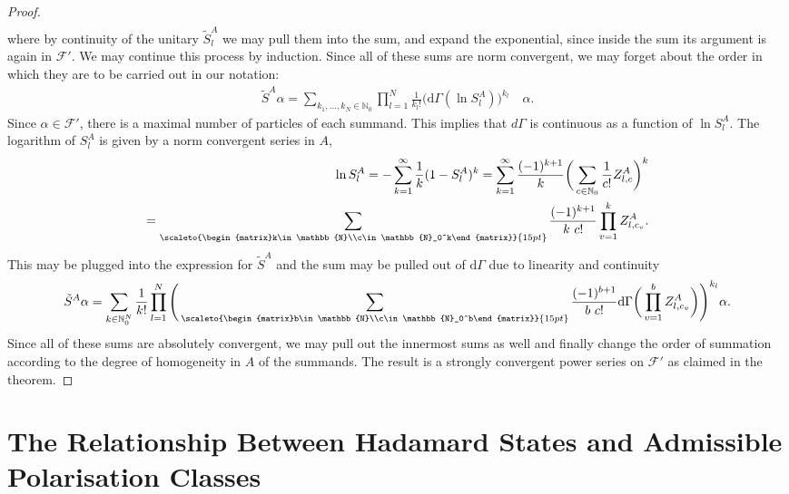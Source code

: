 \documentclass[b5paper,draft,openbib,12pt]{memoir}
\begin{document}
\begin{proof}
\begin{align}
\end{align}
where by continuity of the unitary \(\tilde{S}_{l}^A\) we may pull them into the sum,
and expand the exponential, since inside the sum its argument is again in \(\mathcal{F}'\).
We may continue this process by induction. Since all of these sums are norm convergent, we 
may forget about the order in which they are to be carried out in our notation:
\begin{align}
  \tilde{S}^A\alpha = \sum_{k_1,\dots, k_N\in\mathbb{N}_0}\prod_{l=1}^N \frac{1}{k_l!}\bigg(\mathrm{d}\Gamma(\ln S^A_l)\bigg)^{k_l} \quad \alpha. 
\end{align}
Since \(\alpha\in\mathcal{F}'\), there is a maximal number 
of particles of each summand. This implies that \(d\Gamma\) is 
continuous as a function of \(\ln S^A_l\).
The logarithm of \(S^A_l\) is given by a norm convergent 
series in \(A\),
\begin{align}
  \ln S^A_l=-\sum_{k=1}^\infty \frac{1}{k} (1-S^A_l)^k
  =\sum_{k=1}^\infty \frac{(-1)^{k+1}}{k} \bigg(\sum_{c\in\mathbb{N}_0}\frac{1}{c!} Z_{l,c}^A\bigg)^k\\
=\sum_{\scaleto{\begin{matrix}k\in\mathbb{N}\\c\in\mathbb{N}_0^k\end{matrix}}{15pt}}
  \frac{(-1)^{k+1}}{k ~c!}  \prod_{v=1}^k Z_{l,c_v}^A.
\end{align}
This may be plugged into the expression for \(\tilde{S}^A\)
and the sum may be pulled out of \(\mathrm{d}\Gamma\) due to 
linearity and continuity 
\begin{align}
  \tilde{S}^A\alpha=
  \sum_{k\in\mathbb{N}_0^N}\frac{1}{k!} \prod_{l=1}^N
  \Bigg(\sum_{\scaleto{\begin{matrix}b\in\mathbb{N}\\c\in\mathbb{N}_0^b\end{matrix}}{15pt}}
    \frac{(-1)^{b+1}}{b ~c!}  \mathrm{d}\Gamma\bigg(\prod_{v=1}^b Z_{l,c_v}^A\bigg) \Bigg)^{k_l}\alpha.
\end{align}
Since all of these sums are absolutely convergent, 
we may pull out the innermost sums 
as well and finally change the order of summation according 
to the degree of 
homogeneity in \(A\) of the summands. The result is a 
strongly convergent power series 
on \(\mathcal{F}'\) as claimed in the theorem. 


\end{proof}


\section{The Relationship Between Hadamard States and Admissible Polarisation Classes}\label{sec: hadamard}
\end{document}
